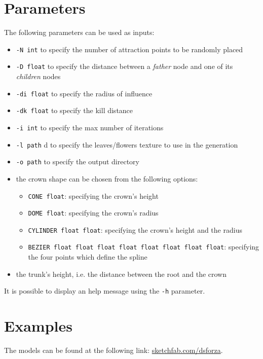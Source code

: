 \documentclass[10pt,a4paper]{article}
\begin{document}
\section{Parameters}

The following parameters can be used as inputs:
\begin{itemize}
	\item \texttt{-N int} to specify the number of attraction points to be randomly placed
	\item \texttt{-D float} to specify the distance between a \textit{father} node and one of its \textit{children} nodes
	\item \texttt{-di float} to specify the radius of influence
	\item \texttt{-dk float} to specify the kill distance
	\item \texttt{-i int} to specify the max number of iterations
	\item \texttt{-l path} d to specify the leaves/flowers texture to use in the generation
	\item \texttt{-o path} to specify the output directory
	\item the crown shape can be chosen from the following options:
    	\begin{itemize}
    		\item \texttt{CONE float}: specifying the crown's height
    		\item \texttt{DOME float}: specifying the crown's radius
    		\item \texttt{CYLINDER float float}: specifying the crown's height and the radius
    		\item \texttt{BEZIER float float float float float float float float}: specifying the four points which define the spline
    	\end{itemize}
	\item the trunk's height, i.e. the distance between the root and the crown
\end{itemize}

It is possible to display an help message using the \texttt{-h} parameter.

\section{Examples}

The models can be found at the following link: \href{https://sketchfab.com/dsforza/collections/trees-from-space-colonization}{sketchfab.com/dsforza}.
\end{document}

